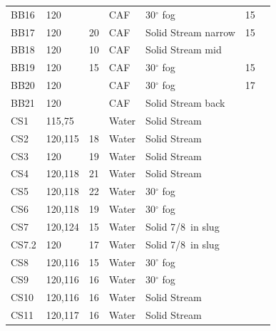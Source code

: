 \documentclass[12pt,oneside]{book}
\begin{document}
\begin{table}[!ht]
\begin{tabular}{lllllll}
BB16       &   120              &               & CAF    &  30$^{\circ}$ fog   & 15                 &          \\
BB17       &   120              & 20            & CAF    &  Solid Stream narrow & 15                &          \\
BB18       &   120              & 10            & CAF    &  Solid Stream mid   &                    &          \\
BB19       &   120              & 15            & CAF    &  30$^{\circ}$ fog   & 15                 &          \\
BB20       &   120              &               & CAF    &  30$^{\circ}$ fog   & 17                 &          \\
BB21       &   120              &               & CAF    &  Solid Stream back  &                    &          \\
CS1        &   115,75           &               & Water  &  Solid Stream       &                    &          \\
CS2        &   120,115          & 18            & Water  &  Solid Stream       &                    &          \\
CS3        &   120              & 19            & Water  &  Solid Stream       &                    &          \\
CS4        &   120,118          & 21            & Water  &  Solid Stream       &                    &          \\
CS5        &   120,118          & 22            & Water  &  30$^{\circ}$ fog   &                    &          \\
CS6        &   120,118          & 19            & Water  &  30$^{\circ}$ fog   &                    &          \\
CS7        &   120,124          & 15            & Water  &  Solid 7/8~in slug  &                    &          \\
CS7.2      &   120              & 17            & Water  &  Solid 7/8~in slug  &                    &          \\
CS8        &   120,116          & 15            & Water  &  30$^{\circ}$ fog   &                    &          \\
CS9        &   120,116          & 16            & Water  &  30$^{\circ}$ fog   &                    &          \\
CS10       &   120,116          & 16            & Water  &  Solid Stream       &                    &          \\
CS11       &   120,117          & 16            & Water  &  Solid Stream       &                    &          \\
\bottomrule[1.25pt]
\end{tabular}\par
\end{table}
\end{document}
